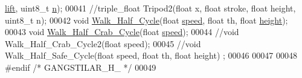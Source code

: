 \begin{DoxyCode}
      \hyperlink{over__hinder_8c_a5e433c2d90f9d7f1ff1868b9e8b91868}{lift}, uint8\_t \hyperlink{gangstilar_8h_a76f11d9a0a47b94f72c2d0e77fb32240}{n});
00041 \textcolor{comment}{//triple\_float Tripod2(float x, float stroke, float height, uint8\_t n); }
00042 \textcolor{keywordtype}{void} \hyperlink{gangstilar_8h_ae56b8515b1ea2c6035e04e3e2df2b52a}{Walk\_Half\_Cycle}(\textcolor{keywordtype}{float} \hyperlink{styr_2styr_2main_8c_a7f7e4724cf57d59513b39c5ecc81adc8}{speed}, \textcolor{keywordtype}{float} th, \textcolor{keywordtype}{float} \hyperlink{gangstilar_8h_a48083b65ac9a863566dc3e3fff09a5b4}{height});
00043 \textcolor{keywordtype}{void} \hyperlink{gangstilar_8h_a4c2ee7390bb80e121c51116c7fe30bd1}{Walk\_Half\_Crab\_Cycle}(\textcolor{keywordtype}{float} \hyperlink{styr_2styr_2main_8c_a7f7e4724cf57d59513b39c5ecc81adc8}{speed});
00044 \textcolor{comment}{//void Walk\_Half\_Crab\_Cycle2(float speed);}
00045 \textcolor{comment}{//void Walk\_Half\_Safe\_Cycle(float speed, float th, float height) ;}
00046 
00047 
00048 \textcolor{preprocessor}{#endif }\textcolor{comment}{/* GANGSTILAR\_H\_ */}\textcolor{preprocessor}{}
00049 
\end{DoxyCode}
